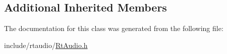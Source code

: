 \subsection*{Additional Inherited Members}


The documentation for this class was generated from the following file\+:\begin{DoxyCompactItemize}
\item 
include/rtaudio/\hyperlink{_rt_audio_8h}{Rt\+Audio.\+h}\end{DoxyCompactItemize}

